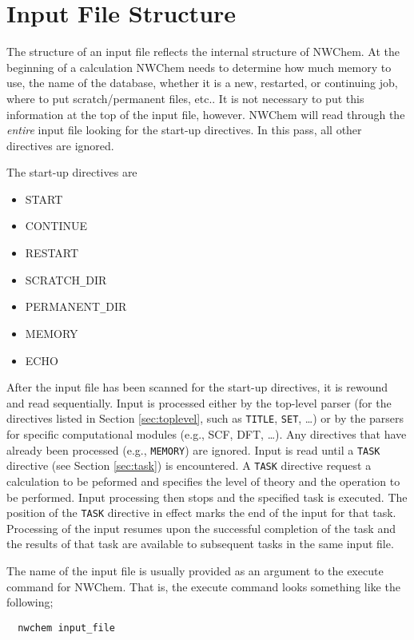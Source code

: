 \section{Input File Structure}
\label{sec:inputstructure}

The structure of an input file reflects the internal structure of
NWChem.  At the beginning of a calculation NWChem needs to determine
how much memory to use, the name of the database, whether it is a new,
restarted, or continuing job, where to put scratch/permanent files,
etc..  It is not necessary to put this information at the top of the
input file, however.  NWChem will read through the {\em entire} input
file looking for the start-up directives.  In this pass, all other
directives are ignored.

The start-up directives are
\begin{itemize}
\item START
\item CONTINUE
\item RESTART
\item SCRATCH{\verb+_+}DIR
\item PERMANENT{\verb+_+}DIR
\item MEMORY
\item ECHO
\end{itemize}

After the input file has been scanned for the start-up directives, it
is rewound and read sequentially.  Input is processed either by the
top-level parser (for the directives listed in Section
\ref{sec:toplevel}, such as \verb+TITLE+, \verb+SET+, \ldots) or by
the parsers for specific computational modules (e.g., SCF, DFT,
\ldots).  Any directives that have already been processed (e.g.,
\verb+MEMORY+) are ignored.  Input is read until a \verb+TASK+
directive (see Section \ref{sec:task}) is encountered.  A \verb+TASK+
directive request a calculation to be peformed and specifies the level
of theory and the operation to be performed.  Input processing then
stops and the specified task is executed.  The position of the
\verb+TASK+ directive in effect marks the end of the input for that
task.  Processing of the input resumes upon the successful completion
of the task and the results of that task are available to subsequent
tasks in the same input file.

The name of the input file is usually provided as an argument to the
execute command for NWChem.  That is, the execute command looks
something like the following;

\begin{verbatim}
  nwchem input_file
\end{verbatim}

